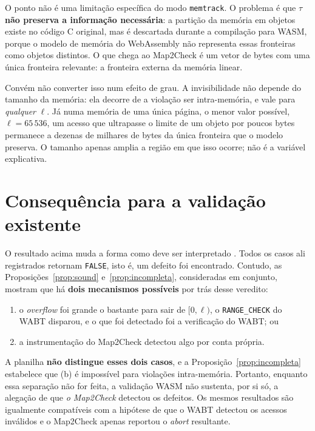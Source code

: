 \documentclass[11pt,a4paper]{article}
\theoremstyle{definition}
\newcommand{\code}[1]{\texttt{#1}}
\begin{document}
O ponto não é uma limitação
específica do modo \code{memtrack}. O problema é que \textbf{$\tau$ não preserva
a informação necessária}: a partição da memória em objetos existe no código C
original, mas é descartada durante a compilação para WASM, porque o modelo de
memória do WebAssembly não representa essas fronteiras como objetos distintos.
O que chega ao Map2Check é um vetor de bytes com uma única fronteira relevante:
a fronteira externa da memória linear.

Convém não converter isso num efeito de grau. A invisibilidade não depende do
tamanho da memória: ela decorre de a violação ser intra-memória, e vale para
\emph{qualquer} $\ell$. Já numa memória de uma única página, o menor valor
possível, $\ell = 65\,536$, um acesso que ultrapasse o limite de um objeto por
poucos bytes permanece a dezenas de milhares de bytes da única fronteira que o
modelo preserva. O tamanho apenas amplia a região em que isso ocorre; não é a
variável explicativa.

\section{Consequência para a validação existente}
\label{sec:atribuicao}

O resultado acima muda a
forma como deve ser interpretado
. Todos os casos ali registrados
retornam \code{FALSE}, isto é, um defeito foi encontrado. Contudo, as
Proposições~\ref{prop:sound} e~\ref{prop:incompleta}, consideradas em conjunto,
mostram que há \textbf{dois mecanismos possíveis} por trás desse veredito:

\begin{enumerate}[label=(\alph*),leftmargin=1.8em]
  \item o \emph{overflow} foi grande o bastante para sair de $[0,\ell)$, o
        \code{RANGE\_CHECK} do WABT disparou, e o que foi detectado foi a
        verificação do WABT; ou
  \item a instrumentação do Map2Check detectou algo por conta própria.
\end{enumerate}

A planilha \textbf{não distingue esses dois
casos}, e a Proposição~\ref{prop:incompleta} estabelece que (b) é impossível
para violações intra-memória. Portanto, enquanto essa separação não for feita,
a validação WASM não sustenta, por si só, a alegação de que \emph{o Map2Check}
detectou os defeitos. Os mesmos resultados são igualmente compatíveis com a
hipótese de que o WABT detectou os acessos inválidos e o Map2Check apenas
reportou o \emph{abort} resultante.
\end{document}
